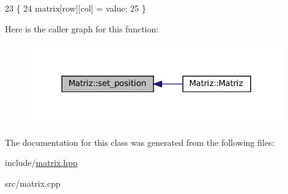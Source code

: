 \begin{DoxyCode}
23 \{
24   matrix[row][col] = value;
25 \}
\end{DoxyCode}
Here is the caller graph for this function\+:
\nopagebreak
\begin{figure}[H]
\begin{center}
\leavevmode
\includegraphics[width=311pt]{classMatriz_a71fea2383ce785254c2f27da25ef70c8_icgraph}
\end{center}
\end{figure}


The documentation for this class was generated from the following files\+:\begin{DoxyCompactItemize}
\item 
include/\hyperlink{matrix_8hpp}{matrix.\+hpp}\item 
src/matrix.\+cpp\end{DoxyCompactItemize}
